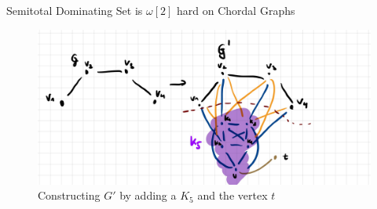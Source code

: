 \begin{theorem}
    Semitotal Dominating Set is $\omega[2]$ hard on Chordal Graphs
\end{theorem}

\begin{figure}[th]
    \includegraphics[scale=0.16]{pages/img/construct-chordal-reduction.jpg}
    \centering
    \caption{Constructing $G'$ by adding a $K_5$ and the vertex $t$}
    \label{fig:construct-chordal-reduction}
\end{figure}

